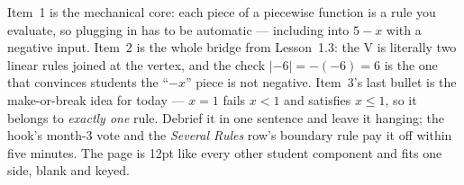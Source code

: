 \documentclass[10pt]{article}
\begin{document}
\begin{teachernote}[Warm-Up]
Item~1 is the mechanical core: each piece of a piecewise function is a rule you evaluate, so
plugging in has to be automatic --- including into $5-x$ with a negative input. Item~2 is the
whole bridge from Lesson~1.3: the V is literally two linear rules joined at the vertex, and the
check $|-6|=-(-6)=6$ is the one that convinces students the ``$-x$'' piece is not negative.
Item~3's last bullet is the make-or-break idea for today --- $x=1$ fails $x<1$ and satisfies
$x\le1$, so it belongs to \emph{exactly one} rule. Debrief it in one sentence and leave it
hanging; the hook's month-3 vote and the \emph{Several Rules} row's boundary rule pay it off within five minutes. The
page is 12pt like every other student component and fits one side, blank and keyed.
\end{teachernote}
\end{document}
